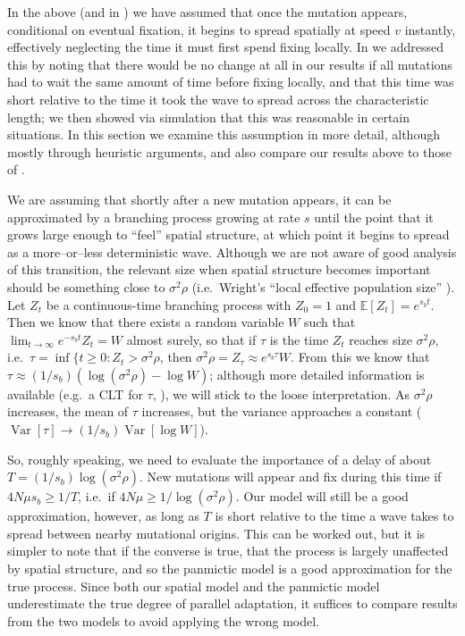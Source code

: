 \documentclass{article}
\newcommand{\var}{\mathop{\mbox{Var}}}
\newcommand{\E}{\mathbb{E}}
\begin{document}
In the above (and in \citet{ralphcoop2010}) we have assumed that once the mutation appears,
conditional on eventual fixation, it begins to spread spatially at speed $v$ instantly,
effectively neglecting the time it must first spend fixing locally.
In \citet{ralphcoop2010} we addressed this by noting that there would be no change at all in our results 
if all mutations had to wait the same amount of time before fixing locally,
and that this time was short relative to the time it took the wave to spread across the characteristic length;
we then showed via simulation that this was reasonable in certain situations.
In this section we examine this assumption in more detail, although mostly through heuristic arguments,
and also compare our results above to those of \citet{softsweeps}.

We are assuming that shortly after a new mutation appears, 
it can be approximated by a branching process growing at rate $s$
until the point that it grows large enough to ``feel'' spatial structure,
at which point it begins to spread as a more--or--less deterministic wave.
Although we are not aware of good analysis of this transition, 
the relevant size when spatial structure becomes important
should be something close to $\sigma^2 \rho$ 
(i.e.\ Wright's ``local effective population size'' \citep{XXX}).
Let $Z_t$ be a continuous-time branching process with $Z_0=1$ and $\E[Z_t] = e^{s_b t}$.
Then we know that there exists a random variable $W$ such that $\lim_{t\to\infty} e^{-s_b t} Z_t = W$ almost surely,
so that if $\tau$ is the time $Z_t$ reaches size $\sigma^2 \rho$, i.e.\ $\tau = \inf\{ t \ge 0: Z_t > \sigma^2 \rho$,
then $\sigma^2 \rho = Z_\tau \approx e^{s_b \tau} W$.
From this we know that $\tau \approx (1/s_b) (\log (\sigma^2 \rho) - \log W)$;
although more detailed information is available (e.g.\ a CLT for $\tau$, \citet{XXX}),
we will stick to the loose interpretation.
As $\sigma^2 \rho$ increases, the mean of $\tau$ increases, but the variance approaches a constant
($\var[\tau] \to (1/s_b) \var[\log W]$).

So, roughly speaking, we need to evaluate the importance of a delay of about $T = (1/s_b) \log (\sigma^2 \rho)$.
New mutations will appear and fix during this time if $4N\mu s_b \ge 1/T$,
i.e.\ if $4 N \mu \ge 1/\log (\sigma^2 \rho)$.
Our model will still be a good approximation, however, 
as long as $T$ is short relative to the time a wave takes to spread between nearby mutational origins.
This can be worked out,
but it is simpler to note that if the converse is true, 
that the process is largely unaffected by spatial structure,
and so the panmictic model is a good approximation for the true process.
Since both our spatial model and the panmictic model underestimate the true degree of parallel adaptation,
it suffices to compare results from the two models to avoid applying the wrong model.
\end{document}
